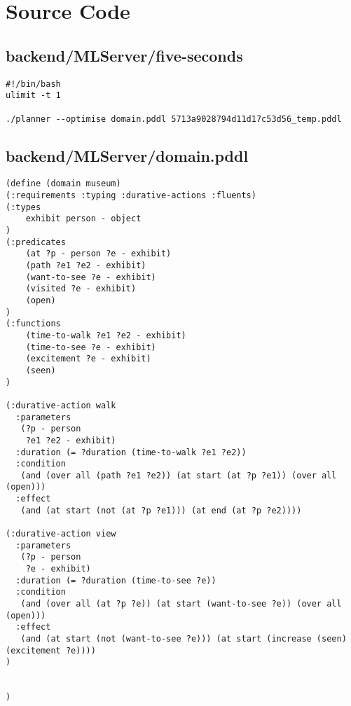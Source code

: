 \chapter{Source Code}
\section{backend/MLServer/five-seconds}
\begin{lstlisting}
#!/bin/bash
ulimit -t 1

./planner --optimise domain.pddl 5713a9028794d11d17c53d56_temp.pddl
\end{lstlisting}
\newpage
\section{backend/MLServer/domain.pddl}
\begin{lstlisting}(define (domain museum)
(:requirements :typing :durative-actions :fluents)
(:types
    exhibit person - object
)
(:predicates
    (at ?p - person ?e - exhibit)
    (path ?e1 ?e2 - exhibit)
    (want-to-see ?e - exhibit)
    (visited ?e - exhibit)
    (open)
)
(:functions
    (time-to-walk ?e1 ?e2 - exhibit)
    (time-to-see ?e - exhibit)
    (excitement ?e - exhibit)
    (seen)
)

(:durative-action walk
  :parameters
   (?p - person
    ?e1 ?e2 - exhibit)
  :duration (= ?duration (time-to-walk ?e1 ?e2))
  :condition
   (and (over all (path ?e1 ?e2)) (at start (at ?p ?e1)) (over all (open)))
  :effect
   (and (at start (not (at ?p ?e1))) (at end (at ?p ?e2))))

(:durative-action view
  :parameters
   (?p - person
    ?e - exhibit)
  :duration (= ?duration (time-to-see ?e))
  :condition
   (and (over all (at ?p ?e)) (at start (want-to-see ?e)) (over all (open)))
  :effect
   (and (at start (not (want-to-see ?e))) (at start (increase (seen) (excitement ?e))))
)


)
\end{lstlisting}
\newpage
